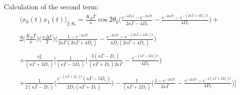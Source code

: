 \documentclass[]{article}
\begin{document}
Calculation of the second term:
 \newline
\begin{multline*}
\langle x_{0}(t)x_{1}(t)\rangle_{\xi,\theta_0}=\frac{K_BT}{\kappa}\cos 2 \theta_0\Bigg(\frac{e^{-4D_r t}-e^{-2\kappa \bar \Gamma t}}{2\kappa \bar \Gamma-4D_r}-\frac{e^{-2\kappa \bar \Gamma t}-e^{-(2\kappa \bar \Gamma +4D_r)t}}{4D_r}\Bigg)+\\ \\ 2\bigg(\frac{K_BT}{\kappa}\bigg)\bigg(\frac{\kappa \Delta \Gamma }{2}\bigg)\Bigg(\frac{1-e^{-2\kappa \bar \Gamma t}}{2\kappa \bar \Gamma(2\kappa \bar \Gamma+4D_r)}-\frac{e^{-2\kappa \bar \Gamma t}-e^{-(2\kappa \bar \Gamma +4D_r)t}}{4D_r(2\kappa \bar \Gamma+4D_r)}\Bigg) \\ \\ +\frac{v_p^2}{(\kappa \bar \Gamma+3D_r)}\Bigg[\frac{1}{(\kappa \bar \Gamma-3D_r)}\Bigg(\frac{3(\kappa \bar \Gamma -D_r)}{(\kappa \bar \Gamma +D_r)2\kappa \bar \Gamma}-\frac{e^{-(\kappa \bar \Gamma -3D_r)t}}{4D_r}\Bigg)\\ \\+\frac{1}{2(\kappa \bar \Gamma-D_r)}\Bigg(\frac{e^{-(\kappa \bar \Gamma +D_r)t}(\kappa \bar \Gamma -5D_r)}{2D_r(\kappa \bar \Gamma +D_r)}\Bigg)
-\frac{1}{(\kappa \bar \Gamma+2D_r)}\Bigg(\frac{1-e^{-2\kappa \bar \Gamma t}}{2\kappa \bar \Gamma}-\frac{e^{-2\kappa \bar \Gamma t}-e^{-2(\kappa \bar \Gamma+2D_r) t}}{4D_r} \Bigg) \Bigg]
\end{multline*}
\clearpage
\end{document}
